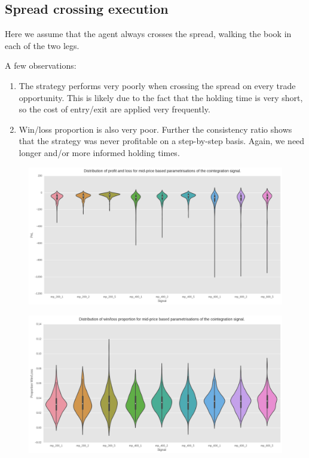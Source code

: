 \subsection{Spread crossing execution}
Here we assume that the agent always crosses the spread, walking the book in
each of the two legs.

A few observations:
\begin{enumerate}
    \item The strategy performs very poorly when crossing the spread on every
        trade opportunity. This is likely due to the fact that the holding time
        is very short, so the cost of entry/exit are applied very frequently.
    \item Win/loss proportion is also very poor. Further the consistency ratio
        shows that the strategy was never profitable on a step-by-step basis.
        Again, we need longer and/or more informed holding times.
\end{enumerate}

\begin{figure}[H]
    \centering
    \includegraphics[width=\figwidth]{img/sp_nodelay.png}

    \caption{}\label{fig:sp_nodelay:pnl}
\end{figure}

\begin{figure}[H]
    \centering
    \includegraphics[width=\figwidth]{img/sp_nodelay_propwl.png}

    \caption{}\label{fig:sp_nodelay:propwl}
\end{figure}

